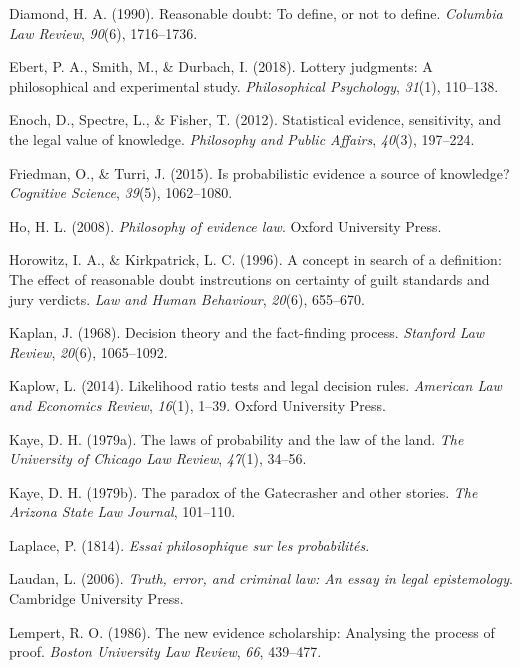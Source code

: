 \documentclass[10pt,dvipsnames,enabledeprecatedfontcommands]{scrartcl}
\begin{document}
\hypertarget{ref-diamond90}{}
Diamond, H. A. (1990). Reasonable doubt: To define, or not to define.
\emph{Columbia Law Review}, \emph{90}(6), 1716--1736.

\hypertarget{ref-ebert2018}{}
Ebert, P. A., Smith, M., \& Durbach, I. (2018). Lottery judgments: A
philosophical and experimental study. \emph{Philosophical Psychology},
\emph{31}(1), 110--138.

\hypertarget{ref-Enoch2012Statistical}{}
Enoch, D., Spectre, L., \& Fisher, T. (2012). Statistical evidence,
sensitivity, and the legal value of knowledge. \emph{Philosophy and
Public Affairs}, \emph{40}(3), 197--224.

\hypertarget{ref-friedman2015}{}
Friedman, O., \& Turri, J. (2015). Is probabilistic evidence a source of
knowledge? \emph{Cognitive Science}, \emph{39}(5), 1062--1080.

\hypertarget{ref-ho08}{}
Ho, H. L. (2008). \emph{Philosophy of evidence law}. Oxford University
Press.

\hypertarget{ref-Horowitz1996}{}
Horowitz, I. A., \& Kirkpatrick, L. C. (1996). A concept in search of a
definition: The effect of reasonable doubt instrcutions on certainty of
guilt standards and jury verdicts. \emph{Law and Human Behaviour},
\emph{20}(6), 655--670.

\hypertarget{ref-Kaplan1968decision}{}
Kaplan, J. (1968). Decision theory and the fact-finding process.
\emph{Stanford Law Review}, \emph{20}(6), 1065--1092.

\hypertarget{ref-kaplow2014likelihood}{}
Kaplow, L. (2014). Likelihood ratio tests and legal decision rules.
\emph{American Law and Economics Review}, \emph{16}(1), 1--39. Oxford
University Press.

\hypertarget{ref-kaye79}{}
Kaye, D. H. (1979a). The laws of probability and the law of the land.
\emph{The University of Chicago Law Review}, \emph{47}(1), 34--56.

\hypertarget{ref-Kaye79gate}{}
Kaye, D. H. (1979b). The paradox of the Gatecrasher and other stories.
\emph{The Arizona State Law Journal}, 101--110.

\hypertarget{ref-Laplace1814}{}
Laplace, P. (1814). \emph{Essai philosophique sur les probabilités}.

\hypertarget{ref-laudan2006truth}{}
Laudan, L. (2006). \emph{Truth, error, and criminal law: An essay in
legal epistemology}. Cambridge University Press.

\hypertarget{ref-Lempert1986}{}
Lempert, R. O. (1986). The new evidence scholarship: Analysing the
process of proof. \emph{Boston University Law Review}, \emph{66},
439--477.
\end{document}
